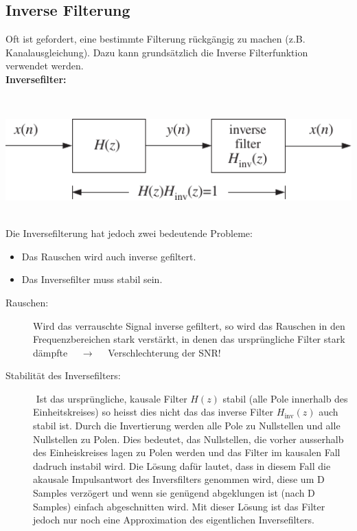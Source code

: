 	\subsection{Inverse Filterung}
		\begin{minipage}{0.47\textwidth}
			Oft ist gefordert, eine bestimmte Filterung rückgängig zu machen (z.B. Kanalausgleichung). Dazu kann grundsätzlich die Inverse Filterfunktion verwendet werden.\\[0.2cm]
			\textbf{Inversefilter:}$\qquad$
		\end{minipage}\begin{minipage}{0.03\textwidth}$ $\end{minipage}
		\begin{minipage}{0.5\textwidth}
			\includegraphics[width = 1\textwidth]{pic/invFiltering.pdf}	
		\end{minipage}\\
		
		Die Inversefilterung hat jedoch zwei bedeutende Probleme:\\[-0.6cm]
		\begin{itemize}
		 \item Das Rauschen wird auch inverse gefiltert.\\[-0.7cm]
		 \item Das Inversefilter muss stabil sein.
		\end{itemize}
		\begin{description}
		 \item [Rauschen:] $ $\newline Wird das verrauschte Signal inverse gefiltert, so wird das Rauschen in den Frequenzbereichen stark verstärkt, in denen das ursprüngliche Filter stark dämpfte $\quad\rightarrow\quad$ Verschlechterung der SNR!\\[0.2cm]
		 \item [Stabilität des Inversefilters:] $ $\newline
			Ist das ursprüngliche, kausale Filter $H(z)$ stabil (alle Pole innerhalb des Einheitskreises) so heisst dies nicht das das inverse Filter $H_\text{inv}(z)$ auch stabil ist. Durch die Invertierung werden alle Pole zu Nullstellen und alle Nullstellen zu Polen. Dies bedeutet, das Nullstellen, die vorher ausserhalb des Einheiskreises lagen zu Polen werden und das Filter im kausalen Fall dadruch instabil wird. Die Lösung dafür lautet, dass in diesem Fall die akausale Impulsantwort des Inversfilters genommen wird, diese um D Samples verzögert und wenn sie genügend abgeklungen ist (nach D Samples) einfach abgeschnitten wird. Mit dieser Lösung ist das Filter jedoch nur noch eine Approximation des eigentlichen Inversefilters.
		\end{description}